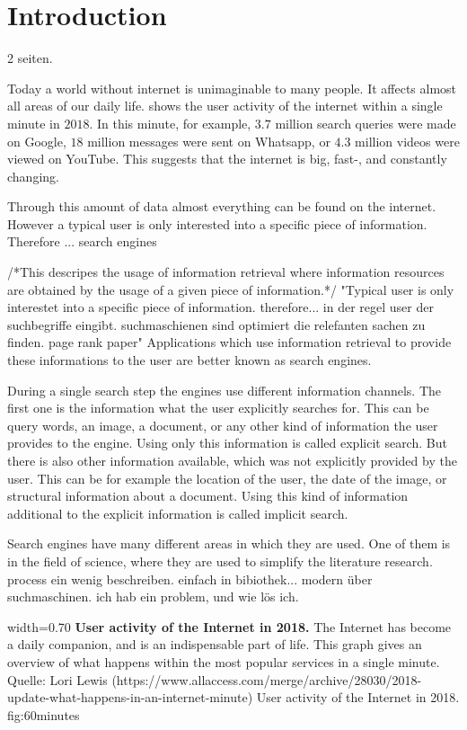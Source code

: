 \chapter{Introduction}
\label{cha:introduction}
2 seiten.

Today a world without internet is unimaginable to many people. It affects almost all areas of our daily life.  shows the user activity of the internet within a single minute in $2018$. In this minute, for example, $3.7$ million search queries were made on Google, $18$ million messages were sent on Whatsapp, or $4.3$ million videos were viewed on YouTube. This suggests that the internet is big, fast-, and constantly changing.

Through this amount of data almost everything can be found on the internet. However a typical user is only interested into a specific piece of information. Therefore ... search engines



/*This descripes the usage of information retrieval where information resources are obtained by the usage of a given piece of information.*/ "Typical user is only interestet into a specific piece of information. therefore... in der regel user der suchbegriffe eingibt. suchmaschienen sind optimiert die relefanten sachen zu finden. page rank paper" Applications which use information retrieval to provide these informations to the user are better known as search engines.

During a single search step the engines use different information channels. The first one is the information what the user explicitly searches for. This can be query words, an image, a document, or any other kind of information the user provides to the engine. Using only this information is called explicit search. But there is also other information available, which was not explicitly provided by the user. This can be for example the location of the user, the date of the image, or structural information about a document. Using this kind of information additional to the explicit information is called implicit search. %

Search engines have many different areas in which they are used. One of them is in the field of science, where they are used to simplify the literature research. process ein wenig beschreiben. einfach in bibiothek... modern über suchmaschinen. ich hab ein problem, und wie lös ich.


      {width=0.70\textwidth}
      {\textbf{User activity of the Internet in 2018.} The Internet has become a daily companion, and is an indispensable part of life. This graph gives an overview of what happens within the most popular services in a single minute.  Quelle: Lori Lewis (https://www.allaccess.com/merge/archive/28030/2018-update-what-happens-in-an-internet-minute)}
      {User activity of the Internet in 2018.}
      {fig:60minutes}

